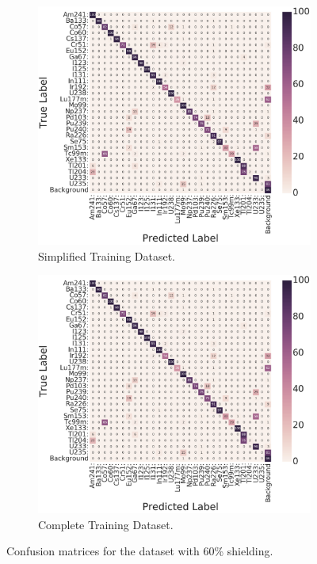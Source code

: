 \begin{figure}[H]
     \centering
     \begin{subfigure}[b]{0.8\textwidth}
         \centering
         \includegraphics[width=\textwidth]{model_choice_hyperparameter_search_images/conf_matrix_example.png}
         \caption{Simplified Training Dataset.}
         \label{fig:results_easy_distance_comparison_simple}
     \end{subfigure}

     \begin{subfigure}[b]{0.8\textwidth}
         \centering
         \includegraphics[width=\textwidth]{model_choice_hyperparameter_search_images/conf_matrix_example.png}
         \caption{Complete Training Dataset.}
         \label{fig:results_easy_distance_comparison_full}
     \end{subfigure}
        \caption{Confusion matrices for the dataset with 60\% shielding.}
        \label{fig:results_easy_distance_comparison}
\end{figure}

